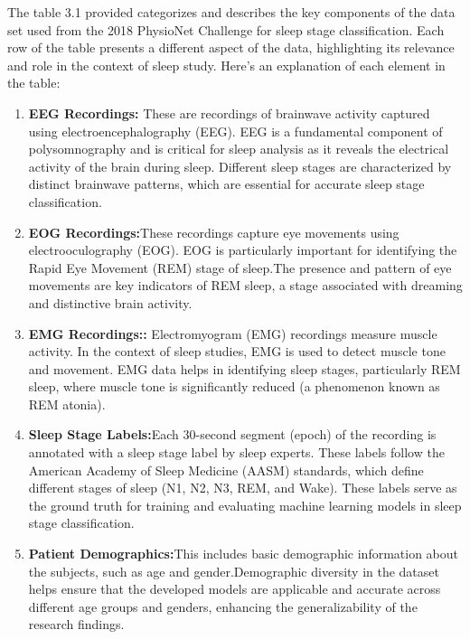 \documentclass[12pt, a4paper,oneside]{book}
\numberwithin{equation}{section}
\begin{document}
The table 3.1 provided categorizes and describes the key components of the data set used from the 2018 PhysioNet Challenge for sleep stage classification. Each row of the table presents a different aspect of the data, highlighting its relevance and role in the context of sleep study. Here's an explanation of each element in the table:
\begin{enumerate}
    \item \textbf{EEG Recordings:}
These are recordings of brainwave activity captured using electroencephalography (EEG). EEG is a fundamental component of polysomnography and is critical for sleep analysis as it reveals the electrical activity of the brain during sleep.\newline
Different sleep stages are characterized by distinct brainwave patterns, which are essential for accurate sleep stage classification.\newline
\item \textbf{EOG Recordings:}These recordings capture eye movements using electrooculography (EOG). EOG is particularly important for identifying the Rapid Eye Movement (REM) stage of sleep.The presence and pattern of eye movements are key indicators of REM sleep, a stage associated with dreaming and distinctive brain activity.
\item \textbf{EMG Recordings::} Electromyogram (EMG) recordings measure muscle activity. In the context of sleep studies, EMG is used to detect muscle tone and movement.
EMG data helps in identifying sleep stages, particularly REM sleep, where muscle tone is significantly reduced (a phenomenon known as REM atonia).
\item \textbf{Sleep Stage Labels:}Each 30-second segment (epoch) of the recording is annotated with a sleep stage label by sleep experts. These labels follow the American Academy of Sleep Medicine (AASM) standards, which define different stages of sleep (N1, N2, N3, REM, and Wake). These labels serve as the ground truth for training and evaluating machine learning models in sleep stage classification.
\item \textbf{Patient Demographics:}This includes basic demographic information about the subjects, such as age and gender.Demographic diversity in the dataset helps ensure that the developed models are applicable and accurate across different age groups and genders, enhancing the generalizability of the research findings.


\end{enumerate}
\end{document}
